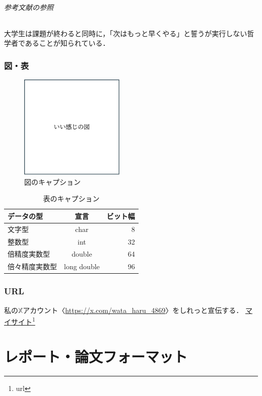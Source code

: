 \documentclass[dvipdfmx]{jsarticle} %
\theoremstyle{definition} %
\newcommand{\x}{$\mathbb{X}$} %
\begin{document}
\paragraph{参考文献の参照}
大学生は課題が終わると同時に，「次はもっと早くやる」と誓うが実行しない哲学者であることが知られている\cite{和文雑誌}．

\section{図・表}
\begin{figure}[H]
  \centering
  \includegraphics[width=50mm]{figures/sample.png}
  \caption{図のキャプション}
  \label{fig:sample_figure}
\end{figure}

\begin{table}[H]
  \caption{表のキャプション}
  \label{tab:sample_table}
  \centering
  \begin{tabular}{lcr}
    \hline
    データの型  & 宣言  &  ビット幅  \\
    \hline \hline
    文字型  & char  & 8 \\
    整数型  & int   & 32 \\
    倍精度実数型  & double  & 64 \\
    倍々精度実数型  &  long double  &  96 \\
    \hline
  \end{tabular}
\end{table}

\section{URL}
私の\x アカウント〈\url{https://x.com/wata_haru_4869}〉をしれっと宣伝する．
\href{https://watanabeharuto.netlify.app/}{マイサイト}\footnote{url}


\part{レポート・論文フォーマット} %
\end{document}
